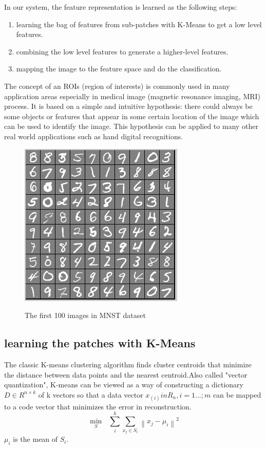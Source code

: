 In our system, the feature representation is learned as the following steps:
\begin{enumerate}
  \item learning the bag of features from sub-patches with K-Means to get a low level features.
  \item combining the low level features to generate a higher-level features.
  \item mapping the image to the feature space and do the classification.
\end{enumerate}
The concept of an ROIs (region of interests) is commonly used in many application areas especially in medical image (magnetic resonance imaging, MRI) process\cite{desikan2006automated}. It is based on a simple and intuitive hypothesis: there could always be some objects or features that appear in some certain location of the image which can be used to identify the image. This hypothesis can be applied to many other real world applications such as hand digital recognitions.
\begin{figure}
  \centering
  \includegraphics[scale = 1]{fig/MNST.png}\\
  \caption{The first 100 images in MNST dataset}
\end{figure}

\subsection{learning the patches with K-Means}
The classic K-means clustering algorithm finds cluster centroids that minimize the distance between data points and the nearest centroid.Also called
"vector quantization", K-means can be viewed as a way of constructing a dictionary $D \in {R^{n \times k}}$ of k vectors so that a data vector $x_(i) in R_n, i = 1...;m$
can be mapped to a code vector that minimizes the error in reconstruction.
\begin{equation}\label{}
  \mathop {\min }\limits_S {\text{ }}\sum\limits_i ^k{\sum\limits_{{x_j} \in {S_i}} {{{\left\| {{x_j} - {\mu _i}} \right\|}^2}} }
\end{equation}
$\mu_i$  is the mean of $S_i$.

